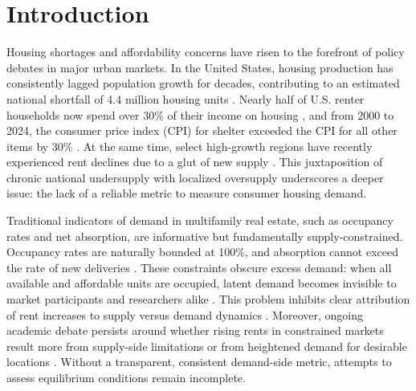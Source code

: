 \documentclass[APA,Times1COL]{WileyNJDv5} %
\begin{document}
\maketitle

\renewcommand\thefootnote{}

\renewcommand\thefootnote{\fnsymbol{footnote}}
\setcounter{footnote}{1}
\FloatBarrier
\section{Introduction}\label{sec1}
Housing shortages and affordability concerns have risen to the forefront of policy debates in major urban markets. In the United States, housing production has consistently lagged population growth for decades, contributing to an estimated national shortfall of 4.4 million housing units \cite{betancourt2022us}. Nearly half of U.S. renter households now spend over 30\% of their income on housing \cite{censusNearlyHalf}, and from 2000 to 2024, the consumer price index (CPI) for shelter exceeded the CPI for all other items by 30\% \cite{stlouisfedConsumerPrice}. At the same time, select high-growth regions have recently experienced rent declines due to a glut of new supply \cite{mott2024ThisRegion}. This juxtaposition of chronic national undersupply with localized oversupply underscores a deeper issue: the lack of a reliable metric to measure consumer housing demand.

Traditional indicators of demand in multifamily real estate, such as occupancy rates and net absorption, are informative but fundamentally supply-constrained. Occupancy rates are naturally bounded at 100\%, and absorption cannot exceed the rate of new deliveries \cite{mueller1999real}. These constraints obscure excess demand: when all available and affordable units are occupied, latent demand becomes invisible to market participants and researchers alike \cite{gabriel2001rental, sirmans1991determinants, pyhrr1999real}. This problem inhibits clear attribution of rent increases to supply versus demand dynamics \cite{pennington2021does, molloy2022housing}. Moreover, ongoing academic debate persists around whether rising rents in constrained markets result more from supply-side limitations \cite{saiz2010geographic} or from heightened demand for desirable locations \cite{davidoff2015supply}. Without a transparent, consistent demand-side metric, attempts to assess equilibrium conditions remain incomplete.
\end{document}
